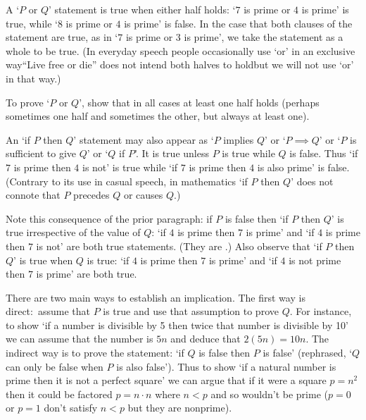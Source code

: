 A `\( P \) or \( Q \)' statement is true when either half holds:
`\( 7 \) is prime or \( 4 \) is prime' is true, while `\( 8 \) is prime
or \( 4 \) is prime' is false.
In the case that both clauses of the statement are true, 
as in `\( 7 \) is prime or \( 3 \) is prime',
we take the statement as a whole to be true.
(In everyday speech people occasionally use `or' in an 
exclusive way\Dash ``Live
free or die'' does not intend both halves to hold\Dash but
we will not use `or' in that way.)

To prove `\( P \) or \( Q \)', show that in all cases at least one
half holds (perhaps sometimes one half and sometimes the other,
but always at least one).



An `if \( P \) then \( Q \)' statement may also appear as
`\( P \) implies \( Q \)' or `\( P\implies Q\)' or 
`\( P \) is sufficient to give \( Q \)' or `$Q$ if $P$'.
It 
is true unless \( P \) is true while \( Q \) is false.
Thus `if \( 7 \) is prime then \( 4 \) is not' is true 
while `if \( 7 \) is prime then \( 4 \) is also prime' is false.
(Contrary to its
use in casual speech, in mathematics `if \( P \) then \( Q \)' 
does not connote that
\( P \) precedes \( Q \) or causes \( Q \).)

Note this consequence of the prior paragraph: 
if $P$ is false then `if \( P \) then \( Q \)' is
true irrespective of the value of $Q$:
`if \( 4 \) is prime then \( 7 \) is prime' and
`if \( 4 \) is prime then \( 7 \) is not' are both true statements.
(They are .)
Also observe that `if \( P \) then \( Q \)' is true when $Q$ is true: 
`if $4$ is prime then $7$ is prime' and 
`if $4$ is not prime then $7$ is prime' are both true.


There are two main ways to establish an implication.
The first way is direct:~assume that \( P \) is true and use that
assumption to prove \( Q \).
For instance,
to show `if a number is divisible by 5 then twice that
number is divisible by 10' we can assume that the number is \( 5n \) and
deduce that \( 2(5n)=10n \).
The indirect way is to prove the 
statement: `if \( Q \) is false then \( P \) is false'
(rephrased, `\( Q \) can only be false when \( P \) is also false').
Thus to show `if a natural number is prime then it
is not a perfect square' we can 
argue that if it were a square \( p=n^2 \) then it could be
factored \( p=n\cdot n \) where \( n<p \) and so wouldn't be prime
(\( p=0 \) or \( p=1 \) don't satisfy \( n<p \) but they
are nonprime).

